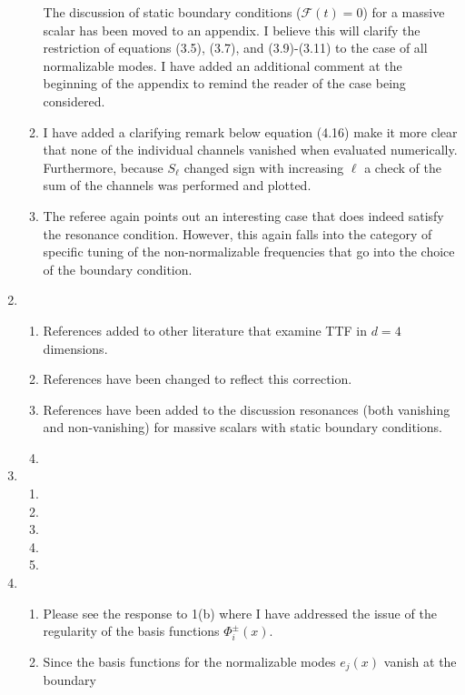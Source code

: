 \documentclass[11pt,letterpaper]{article}
\newcommand{\mc}{\mathcal}
\begin{document}
\begin{enumerate}
\begin{enumerate}
        The discussion of static boundary conditions ($\mc F(t) = 0$) for a massive scalar has been moved to an appendix. I believe this will clarify the restriction of equations (3.5), (3.7), and (3.9)-(3.11) to the case of all normalizable modes. I have added an additional comment at the beginning of the appendix to remind the reader of the case being considered.
        \item I have added a clarifying remark below equation (4.16) make it more clear that none of the individual channels vanished when evaluated numerically. Furthermore, because $S_\ell$ changed sign with increasing $\ell$ a check of the sum of the channels was performed and plotted.
        \item The referee again points out an interesting case that does indeed satisfy the resonance condition. However, this again falls into the category of specific tuning of the non-normalizable frequencies that go into the choice of the boundary condition. 
    \end{enumerate}
    \item %
    \begin{enumerate}
        \item References added to other literature that examine TTF in $d = 4$ dimensions.
        \item References have been changed to reflect this correction.
        \item References have been added to the discussion resonances (both vanishing and non-vanishing) for massive scalars with static boundary conditions.
        \item 
    \end{enumerate}
    \item %
    \begin{enumerate}
        \item 
        \item 
        \item 
        \item 
        \item 
    \end{enumerate}
    \item %
    \begin{enumerate}
        \item Please see the response to 1(b) where I have addressed the issue of the regularity 
        of the basis functions $\Phi^\pm_i(x)$.
        \item Since the basis functions for the normalizable modes $e_j(x)$ vanish at the boundary

\end{enumerate}
\end{enumerate}
\end{document}
